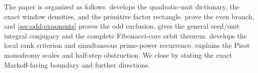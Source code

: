 The paper is organized as follows.  develops the
quadratic-unit dictionary, the exact window densities, and the primitive
factor rectangle.  prove the
even branch, and \cref{sec:odd-exponents} proves the odd exclusion.
 gives the general seed/unit integral conjugacy and the
complete Fibonacci-core orbit theorem.  develops the
local rank criterion and simultaneous prime-power recurrence.
 explains the Pisot monodromy scales and half-step
obstruction. We close by stating the exact Markoff-facing boundary and further
directions.
